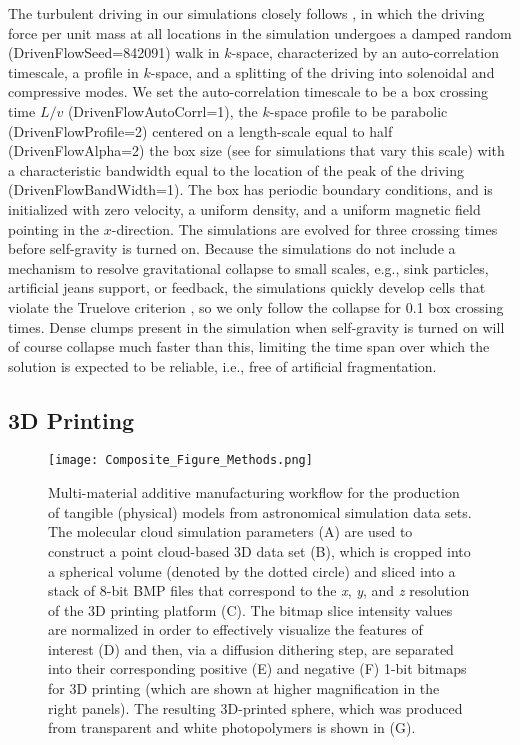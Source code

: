 \documentclass[twocolumn]{aastex63}
\begin{document}
The turbulent driving in our simulations closely follows \citep[][ProblemType = 59 in ENZO]{Schmidt_2009}, in which the driving force per unit mass at all locations in the simulation undergoes a damped random (DrivenFlowSeed=842091) walk in $k$-space, characterized by an auto-correlation timescale, a profile in $k$-space, and a splitting of the driving into solenoidal and compressive modes. We set the auto-correlation timescale to be a box crossing time $L/v$ (DrivenFlowAutoCorrl=1), the $k$-space profile to be parabolic (DrivenFlowProfile=2) centered on a length-scale equal to half (DrivenFlowAlpha=2) the box size (see \citet{Bialy_2020} for simulations that vary this scale) with a characteristic bandwidth equal to the location of the peak of the driving (DrivenFlowBandWidth=1). The box has periodic boundary conditions, and is initialized with zero velocity, a uniform density, and a uniform magnetic field pointing in the $x$-direction. The simulations are evolved for three crossing times before self-gravity is turned on. Because the simulations do not include a mechanism to resolve gravitational collapse to small scales, e.g., sink particles, artificial jeans support, or feedback, the simulations quickly develop cells that violate the Truelove criterion \citep{Truelove_1997, Federrath_2011}, so we only follow the collapse for 0.1 box crossing times. Dense clumps present in the simulation when self-gravity is turned on will of course collapse much faster than this, limiting the time span over which the solution is expected to be reliable, i.e., free of artificial fragmentation. 
\\

\subsection{3D Printing}
\begin{figure*}[t!]
    \centering
    \texttt{[image: Composite\_Figure\_Methods.png]}
    \caption{Multi-material additive manufacturing workflow for the production of tangible (physical) models from astronomical simulation data sets.  The molecular cloud simulation parameters (A) are used to construct a point cloud-based 3D data set (B), which is cropped into a spherical volume (denoted by the dotted circle) and sliced into a stack of 8-bit BMP files that correspond to the \textit{x}, \textit{y}, and \textit{z} resolution of the 3D printing platform (C).  The bitmap slice intensity values are normalized in order to effectively visualize the features of interest (D) and then, via a diffusion dithering step, are separated into their corresponding positive (E) and negative (F) 1-bit bitmaps for 3D printing (which are shown at higher magnification in the right panels).  The resulting 3D-printed sphere, which was produced from transparent and white photopolymers is shown in (G).}
    \label{fig:workflow}
\end{figure*}
\end{document}
